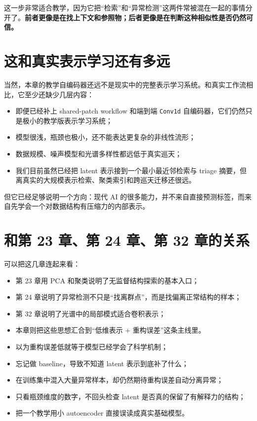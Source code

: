 这一步非常适合教学，因为它把“检索”和“异常检测”这两件常被混在一起的事情分开了。\textbf{前者更像是在找上下文和参照物；后者更像是在判断这种相似性是否仍然可信。}

\section{这和真实表示学习还有多远}

当然，本章的教学自编码器还远不是现实中的完整表示学习系统。和真实工作流相比，它至少还缺少几层内容：

\begin{itemize}
    \item 即便已经补上 shared-patch workflow 和端到端 \texttt{Conv1d} 自编码器，它们仍然只是极小的教学版表示学习系统；
    \item 模型很浅，瓶颈也极小，还不能表达更复杂的非线性流形；
    \item 数据规模、噪声模型和光谱多样性都远低于真实巡天；
    \item 我们目前虽然已经把 latent 表示接到一个最小最近邻检索与 triage 摘要，但离真实的大规模表示检索、聚类索引和跨巡天迁移还很远。
\end{itemize}

但它已经足够说明一个方向：现代 AI 的很多能力，并不来自直接预测标签，而来自先学会一个对数据结构有压缩力的内部表示。

\section{和第 23 章、第 24 章、第 32 章的关系}

可以把这几章连起来看：

\begin{itemize}
    \item 第 23 章用 PCA 和聚类说明了无监督结构探索的基本入口；
    \item 第 24 章说明了异常检测不只是“找离群点”，而是找偏离正常结构的样本；
    \item 第 32 章说明了光谱中的局部模式适合卷积表示；
    \item 本章则把这些思想汇合到“低维表示 + 重构误差”这条主线里。
\end{itemize}

\begin{warnbox}[自编码器入门中的常见误区]
\begin{itemize}
    \item 以为重构误差低就等于模型已经学会了科学机制；
    \item 忘记做 baseline，导致不知道 latent 表示到底补了什么；
    \item 在训练集中混入大量异常样本，却仍然期待重构误差自动分离异常；
    \item 只看瓶颈维度的数字，不回头检查 latent 是否真的保留了有解释力的结构；
    \item 把一个教学用小 autoencoder 直接误读成真实基础模型。
\end{itemize}
\end{warnbox}

